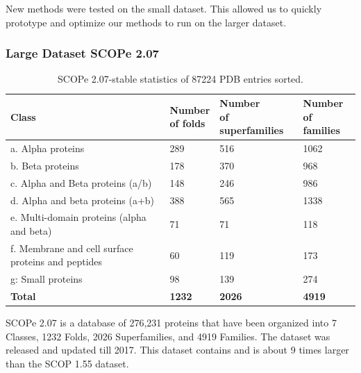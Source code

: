 \documentclass[12pt, a4paper, twocolumn, fullpage]{article}
\theoremstyle{plain}
\theoremstyle{definition}
\theoremstyle{remark}
\begin{document}
New methods were tested on the small dataset. This allowed us to quickly prototype and optimize our methods to run on the larger dataset.

\subsubsection{Large Dataset SCOPe 2.07}

\begin{table}[h]
    \centering
    \begin{tabular}{| l | l | l | l |}
        \hline 
        Class & \makecell{Number \\ of folds} & \makecell{Number  \\ of superfamilies} & \makecell{Number \\ of families} \\ \hline
        a. Alpha proteins & 289 & 516 & 1062 \\ \hline
        b. Beta proteins & 178 & 370 & 968 \\ \hline
        c. Alpha and Beta proteins (a/b) & 148 & 246 & 986 \\ \hline
        d. Alpha and beta proteins (a+b) & 388 & 565 & 1338 \\ \hline
        e. Multi-domain proteins (alpha and beta) & 71 & 71 & 118 \\ \hline
        \makecell[l]{f. Membrane and cell surface \\ proteins and peptides} & 60 & 119 & 173 \\ \hline
        g: Small proteins & 98 & 139 & 274 \\ \hline
        \textbf{Total} & \textbf{1232} & \textbf{2026} & \textbf{4919}  \\ \hline
        \hline
    \end{tabular}
    \caption{ SCOPe 2.07-stable statistics of 87224 PDB entries sorted. }
    \label{}
\end{table}

SCOPe 2.07 is a database of 276,231 proteins that have been organized into 7 Classes, 1232 Folds, 2026 Superfamilies, and 4919 Families. The dataset was released and updated till 2017. This dataset contains and is about 9 times larger than the SCOP 1.55 dataset.
\end{document}
